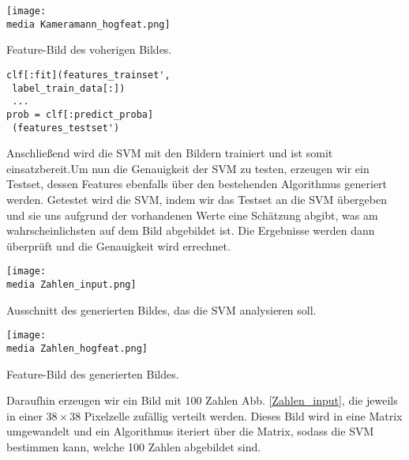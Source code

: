 \begin{dsafigure}
\begin{center}
	\texttt{[image: \\media Kameramann\_hogfeat.png]}
	\caption{Feature-Bild des voherigen Bildes.}
	\label{Kameramann_hogfeat}
\end{center}
\end{dsafigure}

\begin{verbatim}
clf[:fit](features_trainset', 
 label_train_data[:])
 ...
prob = clf[:predict_proba]
 (features_testset')
\end{verbatim}

Anschließend wird die SVM mit den Bildern trainiert und ist somit einsatzbereit.Um nun die Genauigkeit der SVM zu testen, erzeugen wir ein Testset, dessen Features ebenfalls über den bestehenden Algorithmus generiert werden. Getestet wird die SVM, indem wir das Testset an die SVM übergeben und sie uns aufgrund der vorhandenen Werte eine Schätzung abgibt, was am wahrscheinlichsten auf dem Bild abgebildet ist. Die Ergebnisse werden dann überprüft und die Genauigkeit wird errechnet.

\begin{dsafigure}
\begin{center}
	\texttt{[image: \\media Zahlen\_input.png]}
	\caption{Ausschnitt des generierten Bildes, das die SVM analysieren soll.}
	\label{Zahlen_input}
\end{center}
\end{dsafigure}

\begin{dsafigure}
\begin{center}
	\texttt{[image: \\media Zahlen\_hogfeat.png]}
	\caption{Feature-Bild des generierten Bildes.}
	\label{Zahlen_hogfeat}
\end{center}
\end{dsafigure}

Daraufhin erzeugen wir ein Bild mit 100 Zahlen Abb. \ref{Zahlen_input}, die jeweils in einer $38 \times 38$ Pixelzelle zufällig verteilt werden. Dieses Bild wird in eine Matrix umgewandelt und ein Algorithmus iteriert über die Matrix, sodass die SVM bestimmen kann, welche 100 Zahlen abgebildet sind.



